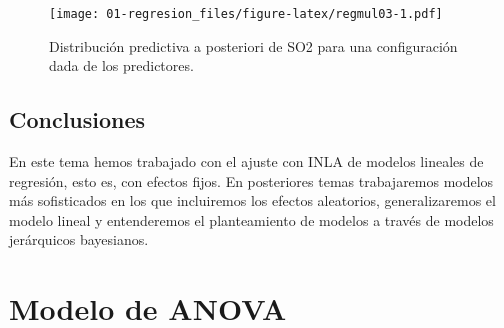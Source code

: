 \documentclass[
]{book}
\newenvironment{Shaded}{\begin{snugshade}}{\end{snugshade}}
\newcommand{\AttributeTok}[1]{\textcolor[rgb]{0.77,0.63,0.00}{#1}}
\newcommand{\ControlFlowTok}[1]{\textcolor[rgb]{0.13,0.29,0.53}{\textbf{#1}}}
\newcommand{\DecValTok}[1]{\textcolor[rgb]{0.00,0.00,0.81}{#1}}
\newcommand{\FloatTok}[1]{\textcolor[rgb]{0.00,0.00,0.81}{#1}}
\newcommand{\FunctionTok}[1]{\textcolor[rgb]{0.00,0.00,0.00}{#1}}
\newcommand{\NormalTok}[1]{#1}
\newcommand{\OtherTok}[1]{\textcolor[rgb]{0.56,0.35,0.01}{#1}}
\newcommand{\SpecialCharTok}[1]{\textcolor[rgb]{0.00,0.00,0.00}{#1}}
\newcommand{\StringTok}[1]{\textcolor[rgb]{0.31,0.60,0.02}{#1}}
\begin{document}
\begin{Shaded}
\end{Shaded}

\begin{figure}
\centering
\texttt{[image: 01-regresion\_files/figure-latex/regmul03-1.pdf]}
\caption{\label{fig:regmul03}Distribución predictiva a posteriori de SO2 para una configuración dada de los predictores.}
\end{figure}

\hypertarget{conclusiones}{%
\section{Conclusiones}\label{conclusiones}}

En este tema hemos trabajado con el ajuste con INLA de modelos lineales de regresión, esto es, con efectos fijos. En posteriores temas trabajaremos modelos más sofisticados en los que incluiremos los efectos aleatorios, generalizaremos el modelo lineal y entenderemos el planteamiento de modelos a través de modelos jerárquicos bayesianos.

\hypertarget{anova}{%
\chapter{Modelo de ANOVA}\label{anova}}
\end{document}
